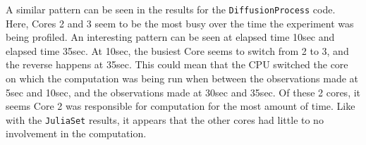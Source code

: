 \documentclass[a4paper,12pt]{article}
\begin{document}
A similar pattern can be seen in the results for the \verb|DiffusionProcess| code. Here, Cores 2 and 3 seem to be the most busy over the time the experiment was being profiled. An interesting pattern can be seen at elapsed time 10sec and elapsed time 35sec. At 10sec, the busiest Core seems to switch from 2 to 3, and the reverse happens at 35sec. This could mean that the CPU switched the core on which the computation was being run when between the observations made at 5sec and 10sec, and the observations made at 30sec and 35sec. Of these 2 cores, it seems Core 2 was responsible for computation for the most amount of time. Like with the \verb|JuliaSet| results, it appears that the other cores had little to no involvement in the computation. 



\end{document}
